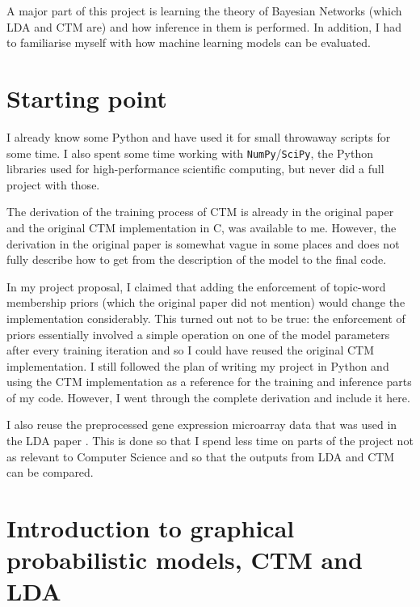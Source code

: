 \documentclass[12pt,a4paper,twoside,openright]{report}
\begin{document}
A major part of this project is learning the theory of Bayesian Networks (which LDA and CTM are) and how inference in them is performed. In addition, I had to familiarise myself with how machine learning models can be evaluated.

\section{Starting point}

I already know some Python and have used it for small throwaway scripts for some time. I also spent some time working with \texttt{NumPy}/\texttt{SciPy}, the Python libraries used for high-performance scientific computing, but never did a full project with those.

The derivation of the training process of CTM is already in the original paper \cite{Blei} and the original CTM implementation in C, was available to me. However, the derivation in the original paper is somewhat vague in some places and does not fully describe how to get from the description of the model to the final code.

In my project proposal, I claimed that adding the enforcement of topic-word membership priors (which the original paper did not mention) would change the implementation considerably. This turned out not to be true: the enforcement  of priors essentially involved a simple operation on one of the model parameters after every training iteration and so I could have reused the original CTM implementation. I still followed the plan of writing my project in Python and using the CTM implementation as a reference for the training and inference parts of my code. However, I went through the complete derivation and include it here.

I also reuse the preprocessed gene expression microarray data that was used in the LDA paper \cite{Pratanwanich2014}. This is done so that I spend less time on parts of the project not as relevant to Computer Science and so that the outputs from LDA and CTM can be compared.

\section{Introduction to graphical probabilistic models, CTM and LDA}
\end{document}
